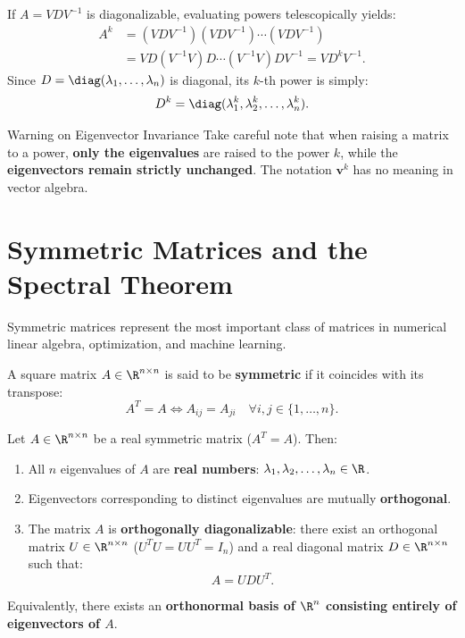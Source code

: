 \begin{corollary}
If $A = V D V^{-1}$ is diagonalizable, evaluating powers telescopically yields:
\begin{align}
    A^k &= (V D V^{-1})(V D V^{-1}) \cdots (V D V^{-1}) \nonumber \\
    &= V D (V^{-1}V) D \cdots (V^{-1}V) D V^{-1} = V D^k V^{-1}.
\end{align}
Since $D = \diag(\lambda_1, \dots, \lambda_n)$ is diagonal, its $k$-th power is simply:
\begin{equation}
    D^k = \diag(\lambda_1^k, \lambda_2^k, \dots, \lambda_n^k).
\end{equation}
\end{corollary}

\begin{alertblock}{Warning on Eigenvector Invariance}
Take careful note that when raising a matrix to a power, \textbf{only the eigenvalues} are raised to the power $k$, while the \textbf{eigenvectors remain strictly unchanged}. The notation $\mathbf{v}^k$ has no meaning in vector algebra.
\end{alertblock}

\FloatBarrier
\section{Symmetric Matrices and the Spectral Theorem}

Symmetric matrices represent the most important class of matrices in numerical linear algebra, optimization, and machine learning.

\begin{definition}
A square matrix $A \in \R^{n \times n}$ is said to be \textbf{symmetric} if it coincides with its transpose:
\begin{equation}
    A^T = A \iff A_{ij} = A_{ji} \quad \forall i, j \in \{1, \dots, n\}.
\end{equation}
\end{definition}

\begin{theorem}
\label{thm:spectral-theorem}
Let $A \in \R^{n \times n}$ be a real symmetric matrix ($A^T = A$). Then:
\begin{enumerate}
    \item All $n$ eigenvalues of $A$ are \textbf{real numbers}: $\lambda_1, \lambda_2, \dots, \lambda_n \in \R$.
    \item Eigenvectors corresponding to distinct eigenvalues are mutually \textbf{orthogonal}.
    \item The matrix $A$ is \textbf{orthogonally diagonalizable}: there exist an orthogonal matrix $U \in \R^{n \times n}$ ($U^T U = U U^T = I_n$) and a real diagonal matrix $D \in \R^{n \times n}$ such that:
    \begin{equation}
        A = U D U^T.
    \end{equation}
\end{enumerate}
Equivalently, there exists an \textbf{orthonormal basis of $\R^n$ consisting entirely of eigenvectors of $A$}.
\end{theorem}


